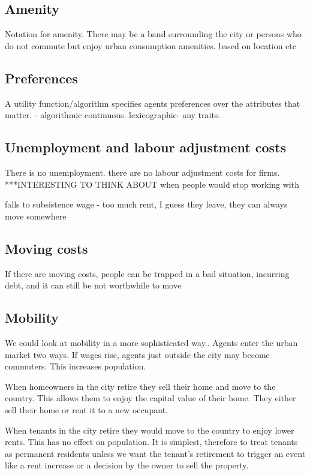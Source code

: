 \subsection{Amenity}
Notation for amenity.
There may be a band surrounding the city or persons who do not commute but enjoy urban consumption amenities. 
based on location etc

\subsection{Preferences}
A utility function/algorithm specifies agents preferences over the attributes that matter. - algorithmic continuous. lexicographic- any traits. 

\subsection{Unemployment and labour adjustment costs}
There is no unemployment. there are no labour adjustment costs for firms. ***INTERESTING TO THINK ABOUT  
when people would stop working with

 falls to subsistence wage -
 too much rent, I guess they leave, they can always move somewhere

\subsection{Moving costs}
     If there are moving costs, people can be trapped in a bad situation, incurring debt, and it can still be not worthwhile to move

\subsection{Mobility}
We could look at mobility in a more sophisticated way..
Agents enter the urban market two ways. If wages rise, agents just outside the city may become commuters. This increases population. 

When homeowners in the city retire they sell their home and move to the country. This allows them  to enjoy the capital value of their home.  They either sell their home or rent it to a new occupant. 

When  tenants in the city retire they would move to the country to enjoy lower rents. This has no effect on population. It is simplest, therefore to treat tenants as permanent residents unless we want the tenant's retirement to trigger an event like a rent increase or a decision by the owner to sell the property.

